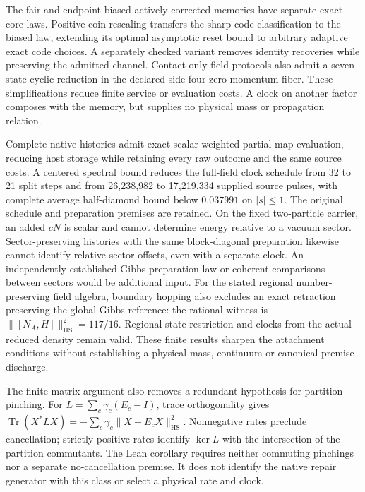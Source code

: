 The fair and endpoint-biased actively corrected memories have separate
exact core laws. Positive coin rescaling transfers the sharp-code
classification to the biased law, extending its optimal asymptotic reset
bound to arbitrary adaptive exact code choices. A separately checked
variant removes identity recoveries while preserving the admitted channel.
Contact-only field protocols also admit a seven-state cyclic reduction in
the declared side-four zero-momentum fiber. These simplifications reduce
finite service or evaluation costs. A clock on another factor composes
with the memory, but supplies no physical mass or propagation relation.

Complete native histories admit exact scalar-weighted partial-map evaluation, reducing host
storage while retaining every raw outcome and the same source costs.
A centered spectral bound reduces the full-field clock schedule from 32 to
21 split steps and from 26,238,982 to 17,219,334 supplied source pulses,
with complete average half-diamond bound below $0.037991$ on $|s|\le1$.
The original schedule and preparation premises are retained. On the fixed
two-particle carrier, an added $cN$ is scalar and cannot determine energy
relative to a vacuum sector. Sector-preserving histories with the same
block-diagonal preparation likewise cannot identify relative sector offsets,
even with a separate clock. An independently established Gibbs preparation
law or coherent comparisons between sectors would be additional input.
For the stated regional number-preserving field algebra, boundary hopping
also excludes an exact retraction preserving the global Gibbs reference:
the rational witness is $\|[N_A,H]\|_{\mathrm{HS}}^2=117/16$.
Regional state restriction and clocks from the actual reduced density remain
valid. These finite results sharpen the attachment conditions without
establishing a physical mass, continuum or canonical premise discharge.

The finite matrix argument also removes a redundant hypothesis for partition
pinching. For $L=\sum_c\gamma_c(E_c-I)$, trace orthogonality gives
$\operatorname{Tr}(X^*LX)=-\sum_c\gamma_c\|X-E_cX\|_{\mathrm{HS}}^2$.
Nonnegative rates preclude cancellation; strictly positive rates identify
$\ker L$ with the intersection of the partition commutants. The Lean
corollary requires neither commuting pinchings nor a separate
no-cancellation premise. It does not identify the native repair generator
with this class or select a physical rate and clock.

